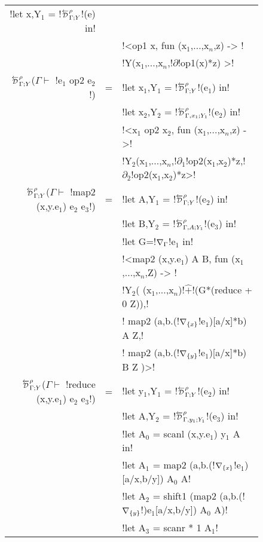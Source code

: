 \begin{figure*}[t]
\begin{tabular}{r c l}
            !let x,Y$_{1}$ = !$\directD{\rho}{\Gamma}{Y}$!(e) in! \\
            && !<op1 x, fun (x$_{1}$,...,x$_n$,z) -> ! \\
            && !Y(x$_{1}$,...,x$_n$,!$\partial$!op1(x)*z) >! \\
        $\directD{\rho}{\Gamma}{Y}$($\Gamma\vdash $ !e$_{1}$ op2 e$_{2}$!) &=& 
            !let x$_{1}$,Y$_{1}$ = !$\directD{\rho}{\Gamma}{Y}$!(e$_{1}$) in! \\
            && !let x$_{2}$,Y$_{2}$ = !$\directD{\rho}{\Gamma,x_1}{Y_1}$!(e$_{2}$) in! \\
            && !<x$_{1}$ op2 x$_{2}$, fun (x$_{1}$,...,x$_n$,z) ->! \\
            && !Y$_{2}$(x$_{1}$,...,x$_n$,!$\partial_1$!op2(x$_{1}$,x$_{2}$)*z,!$\partial_2$!op2(x$_{1}$,x$_{2}$)*z>! \\
        $\directD{\rho}{\Gamma}{Y}$($\Gamma\vdash $ !map2 (x,y.e$_{1}$) e$_{2}$ e$_{3}$!) &=&  
            !let A,Y$_{1}$ = !$\directD{\rho}{\Gamma}{Y}$!(e$_{2}$) in! \\
            && !let B,Y$_{2}$ = !$\directD{\rho}{\Gamma,A}{Y_1}$!(e$_{3}$) in! \\
            && !let G=!$\nabla_{\Gamma}$!e$_{1}$ in!\\
            && !<map2 (x,y.e$_{1}$) A B, fun (x$_{1}$,...,x$_n$,Z) -> !\\
            && !Y$_{2}$( (x$_{1}$,...,x$_n$)!$\widehat{+}$!(G*(reduce + 0 Z)),!\\
            && \quad\quad! map2 (a,b.(!$\nabla_{\{x\}}$!e$_{1}$)[a/x]*b) A Z,!\\
            && \quad\quad! map2 (a,b.(!$\nabla_{\{y\}}$!e$_{1}$)[a/x]*b) B Z )>!\\
        $\directD{\rho}{\Gamma}{Y}$($\Gamma\vdash $ !reduce (x,y.e$_{1}$) e$_{2}$ e$_{3}$!) &=&
            !let y$_{1}$,Y$_{1}$ = !$\directD{\rho}{\Gamma}{Y}$!(e$_{2}$) in! \\
            && !let A,Y$_{2}$ = !$\directD{\rho}{\Gamma,y_1}{Y_1}$!(e$_{3}$) in! \\
            && !let A$_{0}$ = scanl (x,y.e$_{1}$) y$_{1}$ A in! \\
            && !let A$_{1}$ = map2 (a,b.(!$\nabla_{\{x\}}$!e$_{1}$)[a/x,b/y]) A$_{0}$ A! \\
            && !let A$_{2}$ = shift1 (map2 (a,b.(!$\nabla_{\{y\}}$!)e$_{1}$[a/x,b/y]) A$_{0}$ A)! \\
            && !let A$_{3}$ = scanr * 1 A$_{1}$! \\

\end{tabular}
\end{figure*}
